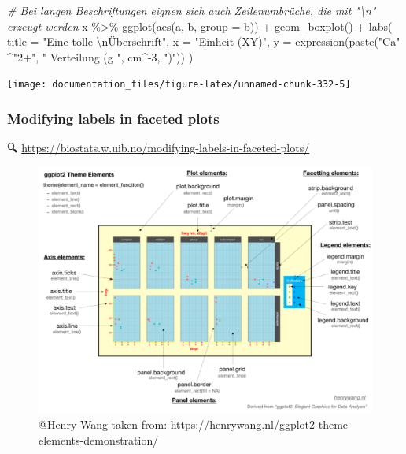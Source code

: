 \documentclass[
]{article}
\newenvironment{Shaded}{\begin{snugshade}}{\end{snugshade}}
\newcommand{\AttributeTok}[1]{\textcolor[rgb]{0.77,0.63,0.00}{#1}}
\newcommand{\CommentTok}[1]{\textcolor[rgb]{0.56,0.35,0.01}{\textit{#1}}}
\newcommand{\DecValTok}[1]{\textcolor[rgb]{0.00,0.00,0.81}{#1}}
\newcommand{\FunctionTok}[1]{\textcolor[rgb]{0.00,0.00,0.00}{#1}}
\newcommand{\NormalTok}[1]{#1}
\newcommand{\SpecialCharTok}[1]{\textcolor[rgb]{0.00,0.00,0.00}{#1}}
\newcommand{\StringTok}[1]{\textcolor[rgb]{0.31,0.60,0.02}{#1}}
\begin{document}
\begin{Shaded}
\begin{Highlighting}[]

\CommentTok{\# Bei langen Beschriftungen eignen sich auch Zeilenumbrüche, die mit "\textbackslash{}n" erzeugt werden}
\NormalTok{x }\SpecialCharTok{\%\textgreater{}\%}
  \FunctionTok{ggplot}\NormalTok{(}\FunctionTok{aes}\NormalTok{(a, b, }\AttributeTok{group =}\NormalTok{ b)) }\SpecialCharTok{+}
  \FunctionTok{geom\_boxplot}\NormalTok{() }\SpecialCharTok{+}
  \FunctionTok{labs}\NormalTok{(}
    \AttributeTok{title =} \StringTok{"Eine tolle }\SpecialCharTok{\textbackslash{}n}\StringTok{Überschrift"}\NormalTok{,}
    \AttributeTok{x =} \StringTok{"Einheit (XY)"}\NormalTok{,}
    \AttributeTok{y =} \FunctionTok{expression}\NormalTok{(}\FunctionTok{paste}\NormalTok{(}\StringTok{"Ca"} \SpecialCharTok{\^{}}\StringTok{"2+"}\NormalTok{, }\StringTok{" Verteilung (g "}\NormalTok{, cm}\SpecialCharTok{\^{}{-}}\DecValTok{3}\NormalTok{, }\StringTok{")"}\NormalTok{))}
\NormalTok{  )}
\end{Highlighting}
\end{Shaded}

\begin{center}\texttt{[image: documentation\_files/figure-latex/unnamed-chunk-332-5]} \end{center}

\hypertarget{modifying-labels-in-faceted-plots}{%
\subsubsection{Modifying labels in faceted plots}\label{modifying-labels-in-faceted-plots}}

🔍 \url{https://biostats.w.uib.no/modifying-labels-in-faceted-plots/}

\begin{figure}

{\centering \includegraphics[width=1\linewidth]{images/048} 

}

\caption{@Henry Wang taken from: https://henrywang.nl/ggplot2-theme-elements-demonstration/}\label{fig:unnamed-chunk-333}
\end{figure}
\end{document}
